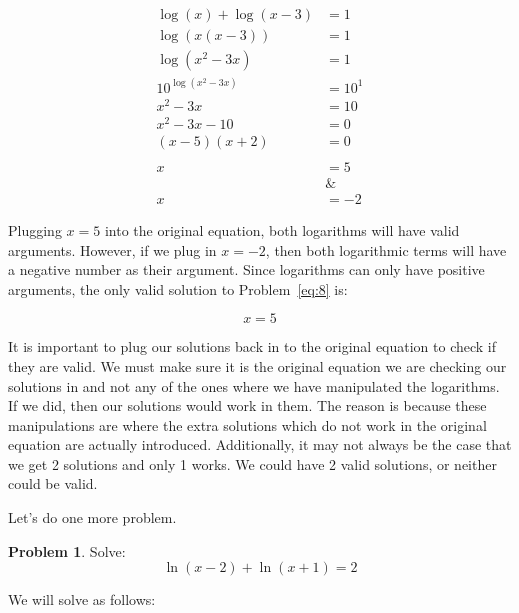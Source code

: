 \documentclass[12pt]{article}
\theoremstyle{definition}
\newtheorem{problem}{Problem}
\begin{document}
\begin{align}
    \log(x) + \log(x-3) & = 1    \\
    \log(x(x-3))        & = 1    \\
    \log(x^2-3x)        & = 1    \\
    10^{\log(x^2-3x)}   & = 10^1 \\
    x^2-3x              & = 10   \\
    x^2-3x-10           & = 0    \\
    (x-5)(x+2)          & = 0    \\
    \nonumber                    \\
    x                   & = 5    \\
                        & \&     \\
    x                   & = -2
\end{align}

Plugging $x=5$ into the original equation, both logarithms will have valid arguments.
However, if we plug in $x=-2$, then both logarithmic terms will have a negative number as their argument.
Since logarithms can only have positive arguments, the only valid solution to Problem~\eqref{eq:8} is:

\begin{equation}
    x = 5
\end{equation}

It is important to plug our solutions back in to the original equation to check if they are valid.
We must make sure it is the original equation we are checking our solutions in and not any of the ones where we have manipulated the logarithms.
If we did, then our solutions would work in them.
The reason is because these manipulations are where the extra solutions which do not work in the original equation are actually introduced.
Additionally, it may not always be the case that we get 2 solutions and only 1 works.
We could have 2 valid solutions, or neither could be valid.

Let's do one more problem.

\begin{problem}
Solve:
\begin{equation*}
    \ln(x-2) + \ln(x+1) = 2 \label{eq:9}
\end{equation*}
\end{problem}

We will solve as follows:
\end{document}
